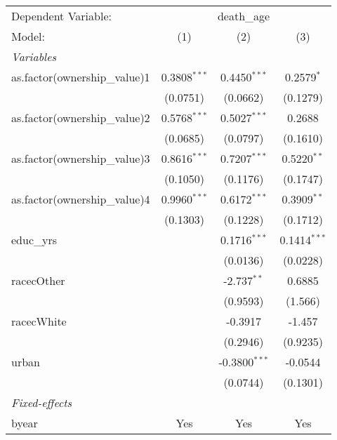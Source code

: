 
\begingroup
\centering
\begin{tabular}{lccc}
   \tabularnewline \midrule \midrule
   Dependent Variable: & \multicolumn{3}{c}{death\_age}\\
   Model:                        & (1)            & (2)             & (3)\\  
   \midrule
   \emph{Variables}\\
   as.factor(ownership\_value)1  & 0.3808$^{***}$ & 0.4450$^{***}$  & 0.2579$^{*}$\\   
                                 & (0.0751)       & (0.0662)        & (0.1279)\\   
   as.factor(ownership\_value)2  & 0.5768$^{***}$ & 0.5027$^{***}$  & 0.2688\\   
                                 & (0.0685)       & (0.0797)        & (0.1610)\\   
   as.factor(ownership\_value)3  & 0.8616$^{***}$ & 0.7207$^{***}$  & 0.5220$^{**}$\\   
                                 & (0.1050)       & (0.1176)        & (0.1747)\\   
   as.factor(ownership\_value)4  & 0.9960$^{***}$ & 0.6172$^{***}$  & 0.3909$^{**}$\\   
                                 & (0.1303)       & (0.1228)        & (0.1712)\\   
   educ\_yrs                     &                & 0.1716$^{***}$  & 0.1414$^{***}$\\   
                                 &                & (0.0136)        & (0.0228)\\   
   racecOther                    &                & -2.737$^{**}$   & 0.6885\\   
                                 &                & (0.9593)        & (1.566)\\   
   racecWhite                    &                & -0.3917         & -1.457\\   
                                 &                & (0.2946)        & (0.9235)\\   
   urban                         &                & -0.3800$^{***}$ & -0.0544\\   
                                 &                & (0.0744)        & (0.1301)\\   
   \midrule
   \emph{Fixed-effects}\\
   byear                         & Yes            & Yes             & Yes\\  

\end{tabular}
